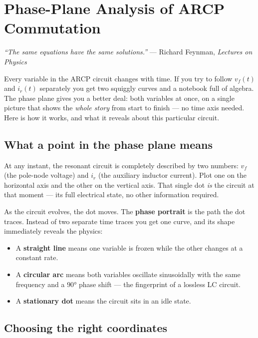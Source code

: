 \documentclass[12pt, a4paper]{article}
\newcommand{\ir}{i_r}
\begin{document}
\section{Phase-Plane Analysis of ARCP Commutation}
\label{sec:phase_plane}

\noindent\textit{``The same equations have the same solutions.''}
\hfill --- Richard Feynman, \emph{Lectures on Physics}

\bigskip\noindent
Every variable in the ARCP circuit changes with time.
If you try to follow $v_f(t)$ and $\ir(t)$ separately you get two squiggly
curves and a notebook full of algebra.
The phase plane gives you a better deal: both variables at once, on a
single picture that shows the \emph{whole story} from start to finish ---
no time axis needed.
Here is how it works, and what it reveals about this particular circuit.

\subsection{What a point in the phase plane means}
\label{ssec:pp_what_point}

At any instant, the resonant circuit is completely described by two numbers:
$v_f$ (the pole-node voltage) and $\ir$ (the auxiliary inductor current).
Plot one on the horizontal axis and the other on the vertical axis.
That single dot \emph{is} the circuit at that moment --- its full electrical
state, no other information required.

As the circuit evolves, the dot moves.
The \textbf{phase portrait} is the path the dot traces.
Instead of two separate time traces you get one curve, and its shape
immediately reveals the physics:
\begin{itemize}
    \item A \textbf{straight line} means one variable is frozen while the
          other changes at a constant rate.
    \item A \textbf{circular arc} means both variables oscillate
          sinusoidally with the same frequency and a $90°$ phase shift ---
          the fingerprint of a lossless LC circuit.
    \item A \textbf{stationary dot} means the circuit sits in an idle state.
\end{itemize}

\subsection{Choosing the right coordinates}
\label{ssec:pp_coords}
\end{document}
